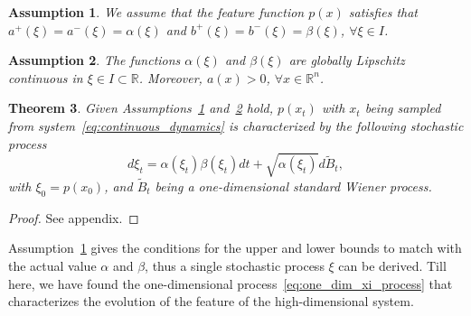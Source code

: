 \documentclass[letterpaper]{article} %
\newcommand{\todo}[1]{\textcolor{blue}{[TODO: #1]}}
\newcommand{\jacob}[1]{\textcolor{blue}{[Jacob: #1]}}
\newtheorem{theorem}{Theorem}
\newtheorem{assumption}[theorem]{Assumption}
\begin{document}
\begin{assumption}
\label{asm:match_upper_lower_bound}
We assume that the feature function $p(x)$ satisfies that $a^{+}(\xi) = a^{-}(\xi) = \alpha(\xi)$ and $b^{+}(\xi) = b^{-}(\xi) = \beta(\xi)$, $\forall \xi \in I$. 
\end{assumption}
\begin{assumption}
\label{asm:continuity-condition-on-a-and-b}
The functions $\alpha(\xi)$ and $\beta(\xi)$ are globally Lipschitz continuous in $\xi \in I \subset \mathbb{R}$.
Moreover, $a(x) > 0$, $\forall x \in \mathbb{R}^{n}$.
\end{assumption}

\begin{theorem}
\label{thm:comparison_lemma}
Given Assumptions~\ref{asm:match_upper_lower_bound} and~\ref{asm:continuity-condition-on-a-and-b} hold, $p(x_t)$ with $x_t$ being sampled from system~\eqref{eq:continuous_dynamics} is characterized by the following stochastic process
\begin{equation}
\label{eq:one_dim_xi_process}
    d \xi_t = \alpha\left(\xi_t\right) \beta\left(\xi_t\right) d t + \sqrt{\alpha\left(\xi_t\right)} d \tilde{B}_t,
\end{equation}
with $\xi_0 = p(x_0)$, and $\tilde{B}_t$ being a one-dimensional standard Wiener process.
\end{theorem}
\begin{proof}
    See appendix.
\end{proof}
Assumption~\ref{asm:match_upper_lower_bound} gives the conditions for the upper and lower bounds to match with the actual value $\alpha$ and $\beta$, thus a single stochastic process $\xi$ can be derived.
Till here, we have found the one-dimensional process~\eqref{eq:one_dim_xi_process} that characterizes the evolution of the feature of the high-dimensional system.
\end{document}
